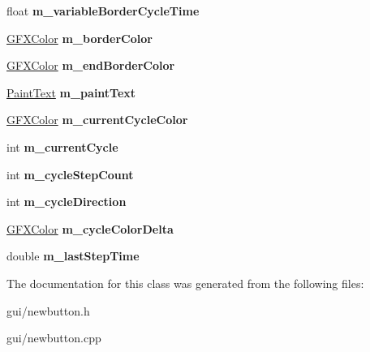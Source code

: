 \begin{DoxyCompactItemize}
\item 
float {\bfseries m\+\_\+variable\+Border\+Cycle\+Time}\hypertarget{classNewButton_a51540d715583f1ed5cecc5ad8c641d64}{}\label{classNewButton_a51540d715583f1ed5cecc5ad8c641d64}

\item 
\hyperlink{structGFXColor}{G\+F\+X\+Color} {\bfseries m\+\_\+border\+Color}\hypertarget{classNewButton_a5f9240efac7da17a6bfa6b2b8efae770}{}\label{classNewButton_a5f9240efac7da17a6bfa6b2b8efae770}

\item 
\hyperlink{structGFXColor}{G\+F\+X\+Color} {\bfseries m\+\_\+end\+Border\+Color}\hypertarget{classNewButton_af1c8ecd6e5404f527be068459f0aa334}{}\label{classNewButton_af1c8ecd6e5404f527be068459f0aa334}

\item 
\hyperlink{classPaintText}{Paint\+Text} {\bfseries m\+\_\+paint\+Text}\hypertarget{classNewButton_aae15a3a0193b14355866d6c89f51a688}{}\label{classNewButton_aae15a3a0193b14355866d6c89f51a688}

\item 
\hyperlink{structGFXColor}{G\+F\+X\+Color} {\bfseries m\+\_\+current\+Cycle\+Color}\hypertarget{classNewButton_a83e54e647064caaf42fd7206dee87f95}{}\label{classNewButton_a83e54e647064caaf42fd7206dee87f95}

\item 
int {\bfseries m\+\_\+current\+Cycle}\hypertarget{classNewButton_ad40888b29a8e554f004500b07f5a02d0}{}\label{classNewButton_ad40888b29a8e554f004500b07f5a02d0}

\item 
int {\bfseries m\+\_\+cycle\+Step\+Count}\hypertarget{classNewButton_a710142b1f43d83d2e832fa906aee215b}{}\label{classNewButton_a710142b1f43d83d2e832fa906aee215b}

\item 
int {\bfseries m\+\_\+cycle\+Direction}\hypertarget{classNewButton_abc0f4b70c4717eb7130d05f4ce8ac99b}{}\label{classNewButton_abc0f4b70c4717eb7130d05f4ce8ac99b}

\item 
\hyperlink{structGFXColor}{G\+F\+X\+Color} {\bfseries m\+\_\+cycle\+Color\+Delta}\hypertarget{classNewButton_a4dfe6d8bb3474193e715139f8619d61b}{}\label{classNewButton_a4dfe6d8bb3474193e715139f8619d61b}

\item 
double {\bfseries m\+\_\+last\+Step\+Time}\hypertarget{classNewButton_a7dd451b1dc33f87a48fa62883fdf9369}{}\label{classNewButton_a7dd451b1dc33f87a48fa62883fdf9369}

\end{DoxyCompactItemize}


The documentation for this class was generated from the following files\+:\begin{DoxyCompactItemize}
\item 
gui/newbutton.\+h\item 
gui/newbutton.\+cpp\end{DoxyCompactItemize}
